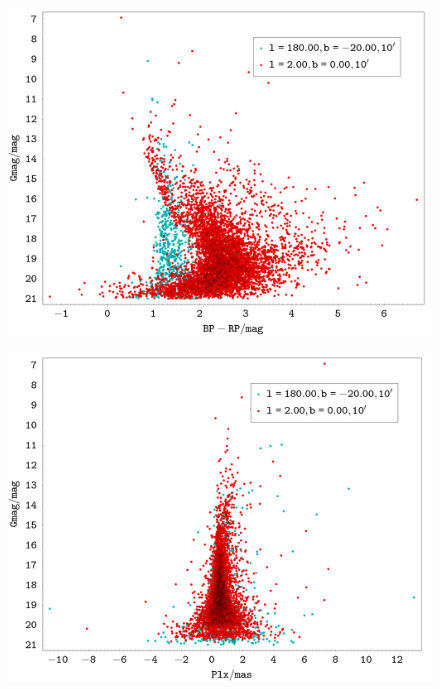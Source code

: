 \documentclass[a4paper,fleqn,usenatbib]{mnras}
\begin{document}
\begin{figure}
  \includegraphics[width=\linewidth]{img/ejercicio1_bprp_gmag}
\end{figure}

\begin{figure}
  \includegraphics[width=\linewidth]{img/ejercicio1_plx_gmag}
\end{figure}
\end{document}
